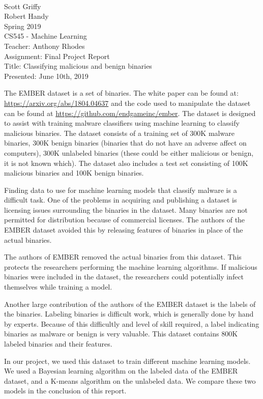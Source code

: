 \documentclass[12pt]{article}
\begin{document}
~\\
Scott Griffy \\
Robert Handy \\
Spring 2019 \\
CS545 - Machine Learning \\
Teacher: Anthony Rhodes \\
Assignment: Final Project Report \\
Title: Classifying malicious and benign binaries \\
Presented: June 10th, 2019 \\
\par
The EMBER dataset is a set of binaries.
The white paper can be found at: \url{https://arxiv.org/abs/1804.04637} and the code used to manipulate the dataset can be found at \url{https://github.com/endgameinc/ember}.
The dataset is designed to assist with training malware classifiers using machine learning to classify malicious binaries.
The dataset consists of a training set of 300K malware binaries, 300K benign binaries (binaries that do not have an adverse affect on computers), 300K unlabeled binaries (these could be either malicious or benign, it is not known which).
The dataset also includes a test set consisting of 100K malicious binaries and 100K benign binaries.
\par
Finding data to use for machine learning models that classify malware is a difficult task.
One of the problems in acquiring and publishing a dataset is licensing issues surrounding the binaries in the dataset.
Many binaries are not permitted for distribution because of commercial licenses.
The authors of the EMBER dataset avoided this by releasing features of binaries in place of the actual binaries.
\par
The authors of EMBER removed the actual binaries from this dataset.
This protects the researchers performing the machine learning algorithms.
If malicious binaries were included in the dataset, the researchers could potentially infect themselves while training a model.
\par
Another large contribution of the authors of the EMBER dataset is the labels of the binaries. Labeling binaries is difficult work, which is generally done by hand by experts. Because of this difficultly and level of skill required, a label indicating binaries as malware or benign is very valuable. This dataset contains 800K labeled binaries and their features.
\par
In our project, we used this dataset to train different machine learning models.
We used a Bayesian learning algorithm on the labeled data of the EMBER dataset, and a K-means algorithm on the unlabeled data. We compare these two models in the conclusion of this report.
\end{document}
